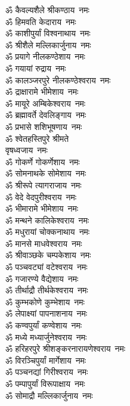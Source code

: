 \begin{multicols}{2}
\begin{flushleft}
ॐ कैवल्यशैले श्रीकण्ठाय~नमः\\
ॐ हिमवति केदाराय~नमः\\
ॐ काशीपुर्यां विश्वनाथाय~नमः\\
ॐ श्रीशैले मल्लिकार्जुनाय~नमः\\
ॐ प्रयागे नीलकण्ठेशाय~नमः\\
ॐ गयायां रुद्राय~नमः\\
ॐ कालञ्जरपुरे नीलकण्ठेश्वराय~नमः\\
ॐ द्राक्षारामे भीमेशाय~नमः\\
ॐ मायूरे अम्बिकेश्वराय~नमः\\
ॐ ब्रह्मावर्ते देवलिङ्गाय~नमः\hfill{}\\
ॐ प्रभासे शशिभूषणाय~नमः\\
ॐ श्वेतहस्तिपुरे श्रीमते\\ वृषध्वजाय~नमः\\
ॐ गोकर्णे गोकर्णेशाय~नमः\\
ॐ सोमनाथके सोमेशाय~नमः\\
ॐ श्रीरूपे त्यागराजाय~नमः\\
ॐ वेदे वेदपुरीश्वराय~नमः\\
ॐ भीमारामे भीमेशाय~नमः\\
ॐ मन्थने कालिकेश्वराय~नमः\\
ॐ मधुरायां चोक्कनाथाय~नमः\\
ॐ मानसे माधवेश्वराय~नमः\hfill{}\\
ॐ श्रीवाञ्छके चम्पकेशाय~नमः\\
ॐ पञ्चवट्यां वटेश्वराय~नमः\\
ॐ गजारण्ये वैद्येशाय~नमः\\
ॐ तीर्थाद्रौ तीर्थकेश्वराय~नमः\\
ॐ कुम्भकोणे कुम्भेशाय~नमः\\
ॐ लेपाक्ष्यां पापनाशनाय~नमः\\
ॐ कण्वपुर्यां कण्वेशाय~नमः\\
ॐ मध्ये मध्यार्जुनेश्वराय~नमः\\
ॐ हरिहरपुरे श्रीशङ्करनारायणेश्वराय~नमः\\
ॐ विरञ्चिपुर्यां मार्गेशाय~नमः\hfill{}\\
ॐ पञ्चनद्यां गिरीश्वराय~नमः\\
ॐ पम्पापुर्यां विरूपाक्षाय~नमः\\
ॐ सोमाद्रौ मल्लिकार्जुनाय~नमः\\

\end{flushleft}
\end{multicols}
